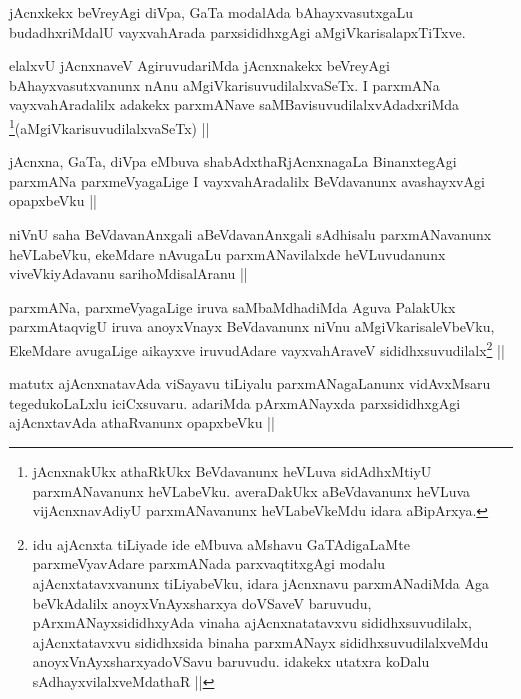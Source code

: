 \begin{artha}
jAcnxkekx beVreyAgi diVpa, GaTa modalAda bAhayxvasutxgaLu budadhxriMdalU vayxvahArada parxsididhxgAgi aMgiVkarisalapxTiTxve. 
\end{artha}

\begin{artha}
elalxvU jAcnxnaveV AgiruvudariMda jAcnxnakekx beVreyAgi bAhayxvasutxvanunx nAnu aMgiVkarisuvudilalxvaSeTx. I parxmANa vayxvahAradalilx adakekx parxmANave saMBavisuvudilalxvAdadxriMda \footnote{jAcnxnakUkx athaRkUkx BeVdavanunx heVLuva sidAdhxMtiyU parxmANavanunx heVLabeVku. averaDakUkx aBeVdavanunx heVLuva vijAcnxnavAdiyU parxmANavanunx heVLabeVkeMdu idara aBipArxya.}(aMgiVkarisuvudilalxvaSeTx) || 
\end{artha}

\begin{artha}
jAcnxna, GaTa, diVpa eMbuva shabAdxthaRjAcnxnagaLa BinanxtegAgi parxmANa parxmeVyagaLige I vayxvahAradalilx BeVdavanunx avashayxvAgi opapxbeVku ||
\end{artha}

\begin{artha}
niVnU saha BeVdavanAnxgali aBeVdavanAnxgali sAdhisalu parxmANavanunx heVLabeVku, ekeMdare nAvugaLu parxmANavilalxde heVLuvudanunx viveVkiyAdavanu sarihoMdisalAranu ||
\end{artha}

\begin{artha}
parxmANa, parxmeVyagaLige iruva saMbaMdhadiMda Aguva PalakUkx parxmAtaqvigU iruva anoyxVnayx BeVdavanunx niVnu aMgiVkarisaleVbeVku, EkeMdare avugaLige aikayxve iruvudAdare vayxvahAraveV sididhxsuvudilalx\footnote{idu ajAcnxta tiLiyade ide eMbuva aMshavu GaTAdigaLaMte parxmeVyavAdare parxmANada parxvaqtitxgAgi modalu ajAcnxtatavxvanunx tiLiyabeVku, idara jAcnxnavu parxmANadiMda Aga beVkAdalilx anoyxVnAyxsharxya doVSaveV baruvudu, pArxmANayxsididhxyAda vinaha ajAcnxnatatavxvu sididhxsuvudilalx, ajAcnxtatavxvu sididhxsida binaha parxmANayx sididhxsuvudilalxveMdu anoyxVnAyxsharxyadoVSavu baruvudu. idakekx utatxra koDalu sAdhayxvilalxveMdathaR ||} ||
\end{artha}

\begin{artha}
matutx ajAcnxnatavAda viSayavu tiLiyalu parxmANagaLanunx vidAvxMsaru tegedukoLaLxlu iciCxsuvaru. adariMda pArxmANayxda parxsididhxgAgi ajAcnxtavAda athaRvanunx opapxbeVku ||
\end{artha}

